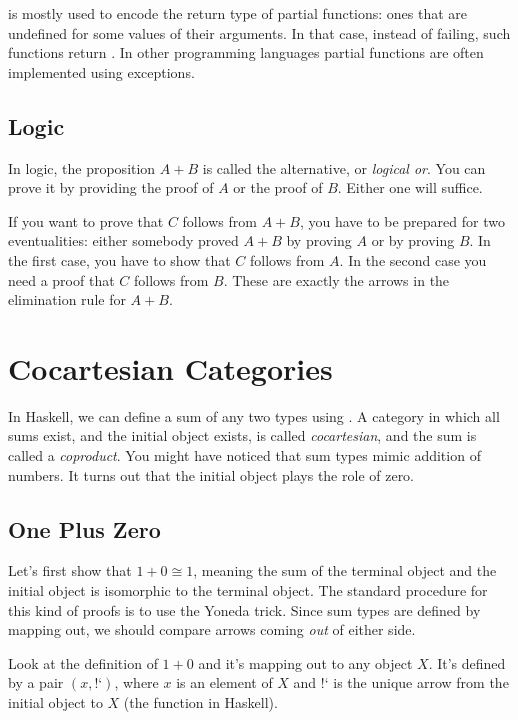 \documentclass[DaoFP]{subfiles}
\begin{document}
 is mostly used to encode the return type of partial functions: ones that are undefined for some values of their arguments. In that case, instead of failing, such functions return . In other programming languages partial functions are often implemented using exceptions.

\subsection{Logic}

In logic, the proposition $A + B$ is called the alternative, or \emph{logical or}. You can prove it by providing the proof of $A$ or the proof of $B$. Either one will suffice. 

If you want to prove that $C$ follows from $A+B$, you have to be prepared for two eventualities: either somebody proved $A+B$ by proving $A$ or by proving $B$. In the first case, you have to show that $C$ follows from $A$. In the second case you need a proof that $C$ follows from $B$. These are exactly the arrows in the elimination rule for $A+B$.

\section{Cocartesian Categories}

In Haskell, we can define a sum of any two types using . A category in which all sums exist, and the initial object exists, is called \emph{cocartesian}, and the sum is called a \emph{coproduct}. You might have noticed that sum types mimic addition of numbers. It turns out that the initial object plays the role of zero. 



\subsection{One Plus Zero}
Let's first show that $1 + 0 \cong 1$, meaning the sum of the terminal object and the initial object is isomorphic to the terminal object. The standard procedure for this kind of proofs is to use the Yoneda trick. Since sum types are defined by mapping out, we should compare arrows coming \emph{out} of either side. 
 
Look at the definition of $1 + 0$ and it's mapping out to any object $X$. It's defined by a pair $(x, \mbox{!`})$, where $x$ is an element of $X$ and $\mbox{!`}$ is the unique arrow from the initial object to $X$ (the  function in Haskell). 
\end{document}
